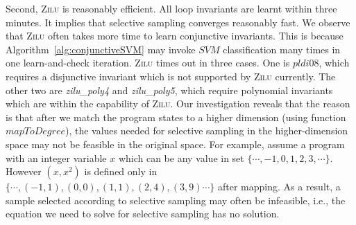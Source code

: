 

Second, \textsc{Zilu} is reasonably efficient. All loop invariants are learnt within three minutes. 
It implies that selective sampling converges reasonably fast.
We observe that \textsc{Zilu} often takes more time to learn conjunctive invariants. 
This is because Algorithm~\ref{alg:conjunctiveSVM} may invoke $\mathit{SVM}$ classification many times in one learn-and-check iteration.
\textsc{Zilu} times out in three cases. One is $pldi08$, which requires a disjunctive invariant which is not supported by \textsc{Zilu} currently. 
The other two are \emph{zilu\_poly4} and \emph{zilu\_poly5}, which require polynomial invariants which are within the capability of \textsc{Zilu}. 
Our investigation reveals that the reason is that after we match the program states to a higher dimension (using function $\mathit{mapToDegree}$), 
the values needed for selective sampling in the higher-dimension space may not be feasible in the original space. 
For example, assume a program with an integer variable $\mathit{x}$ which can be any value in set $\mathit{\{\cdots, -1, 0,  1, 2, 3, \cdots\}}$. 
However $\mathit{(x, x^2)}$ is defined only in $\mathit{\{\cdots, (-1,1), (0,0), (1,1), (2, 4), (3, 9) \cdots\}}$ after mapping. 
As a result, a sample selected according to selective sampling may often be infeasible, i.e., the equation we need to solve for selective sampling has no solution.

